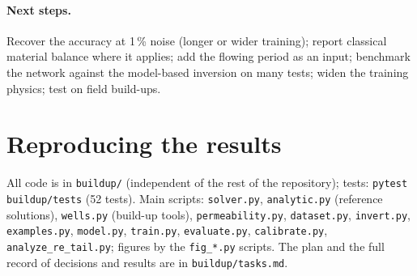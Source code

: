 \documentclass[11pt]{article}
\begin{document}
\paragraph{Next steps.} Recover the accuracy at 1\,\% noise (longer or wider training); report classical material
balance where it applies; add the flowing period as an input; benchmark the network against the model-based
inversion on many tests; widen the training physics; test on field build-ups.

\appendix
\section{Reproducing the results}

All code is in \texttt{buildup/} (independent of the rest of the repository); tests:
\texttt{pytest buildup/tests} (52 tests). Main scripts: \texttt{solver.py}, \texttt{analytic.py} (reference
solutions), \texttt{wells.py} (build-up tools), \texttt{permeability.py}, \texttt{dataset.py},
\texttt{invert.py}, \texttt{examples.py}, \texttt{model.py}, \texttt{train.py}, \texttt{evaluate.py},
\texttt{calibrate.py}, \texttt{analyze\_re\_tail.py}; figures by the \texttt{fig\_*.py} scripts. The plan and the
full record of decisions and results are in \texttt{buildup/tasks.md}.
\end{document}
